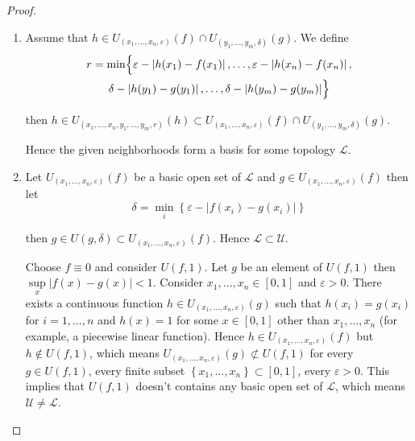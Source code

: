 \begin{proof}
	\begin{enumerate}[label={(\alph*)}]
		\item Assume that \( h \in U_{(x_{1}, \ldots, x_{n}, \varepsilon)}(f) \cap U_{(y_{1}, \ldots, y_{m}, \delta)}(g) \). We define
		      \begin{multline*}
			      r = \min\Bigl\{ \varepsilon - \left\vert h(x_{1}) - f(x_{1}) \right\vert, \ldots, \varepsilon - \left\vert h(x_{n}) - f(x_{n}) \right\vert, \\
			      \delta - \left\vert h(y_{1}) - g(y_{1}) \right\vert, \ldots, \delta - \left\vert h(y_{m}) - g(y_{m}) \right\vert \Bigr\}
		      \end{multline*}

		      then \( h \in U_{(x_{1}, \ldots, x_{n}, y_{1}, \ldots, y_{m}, r)}(h) \subset U_{(x_{1}, \ldots, x_{n}, \varepsilon)}(f) \cap U_{(y_{1}, \ldots, y_{m}, \delta)}(g) \).

		      Hence the given neighborhoods form a basis for some topology \( \mathscr{L} \).
		\item Let \( U_{(x_{1}, \ldots, x_{n}, \varepsilon)}(f) \) be a basic open set of \( \mathscr{L} \) and \( g \in U_{(x_{1}, \ldots, x_{n}, \varepsilon)}(f) \) then let
		      \[
			      \delta = \min\limits_{i}\left\{ \varepsilon - \left\vert f(x_{i}) - g(x_{i}) \right\vert \right\}
		      \]

		      then \( g \in U(g, \delta) \subset U_{(x_{1}, \ldots, x_{n}, \varepsilon)}(f) \). Hence \( \mathscr{L} \subset \mathscr{U} \).

		      Choose \( f \equiv 0 \) and consider \( U(f, 1) \). Let \( g \) be an element of \( U(f, 1) \) then \( \sup\limits_{x}\left\vert f(x) - g(x) \right\vert < 1 \). Consider \( x_{1}, \ldots, x_{n} \in [0, 1] \) and \( \varepsilon > 0 \). There exists a continuous function \( h \in U_{(x_{1}, \ldots, x_{n}, \varepsilon)}(g) \) such that \( h(x_{i}) = g(x_{i}) \) for \( i = 1, \ldots, n \) and \( h(x) = 1 \) for some \( x \in [0, 1] \) other than \( x_{1}, \ldots, x_{n} \) (for example, a piecewise linear function). Hence \( h \in U_{(x_{1}, \ldots, x_{n}, \varepsilon)}(f) \) but \( h \notin U(f, 1) \), which means \( U_{(x_{1}, \ldots, x_{n}, \varepsilon)}(g) \not\subset U(f, 1) \) for every \( g \in U(f, 1) \), every finite subset \( \left\{ x_{1}, \ldots, x_{n} \right\} \subset [0, 1] \), every \( \varepsilon > 0 \). This implies that \( U(f, 1) \) doesn't contains any basic open set of \( \mathscr{L} \), which means \( \mathscr{U} \ne \mathscr{L} \).


\end{enumerate}
\end{proof}
